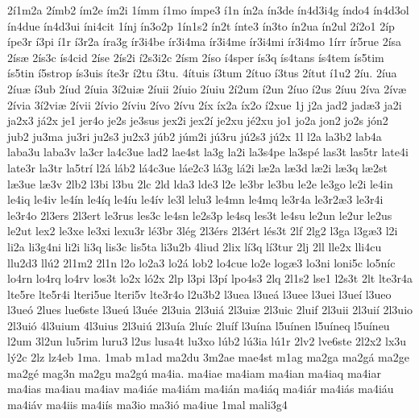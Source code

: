 {2^^ed1m2a
2^^edmb2
^^edm2e
^^edm2i
1^^edmm
^^ed1mo
^^edmpe3
^^ed1n
^^edn2a
^^edn3de
^^edn4d3i4g
^^edndo4
^^edn4d3ol
^^edn4due
^^edn4d3ui
^^edni4cit
1^^ednj
^^edn3o2p
1^^edn1s2
^^edn2t
^^ednte3
^^edn3to
^^edn2ua
^^edn2ul
2^^ed2o1
2^^edp
^^edpe3r
^^ed3pi
^^ed1r
^^ed3r2a
^^edra3g
^^edr3i4be
^^edr3i4ma
^^edr3i4me
^^edr3i4mi
^^edr3i4mo
1^^edrr
^^edr5rue
2^^edsa
2^^eds^^e6
2^^eds3c
^^eds4cid
2^^edse
2^^eds2i
^^ed2s3i2c
2^^edsm
2^^edso
^^ed4sper
^^eds3q
^^eds4tans
^^eds4tem
^^eds5tim
^^eds5tin
^^ed5strop
^^eds3uis
^^edte3r
^^ed2tu
^^ed3tu.
4^^edtuis
^^ed3tum
2^^edtuo
^^ed3tus
2^^edtut
^^ed1u2
2^^edu.
2^^edua
2^^edu^^e6
^^ed3ub
2^^edud
2^^eduia
3^^ed2ui^^e6
2^^eduii
2^^eduio
2^^eduiu
2^^ed2um
^^ed2un
2^^eduo
^^ed2us
2^^eduu
2^^edva
2^^edv^^e6
2^^edvia
3^^ed2vi^^e6
2^^edvii
2^^edvio
2^^edviu
2^^edvo
2^^edvu
2^^edx
^^edx2a
^^edx2o
^^ed2xue
1j
j2a
jad2
jad^^e63
ja2i
ja2x3
j^^e12x
je1
jer4o
je2s
je3sus
jex2i
jex2^^ed
je2xu
j^^e92xu
jo1
jo2a
jon2
jo2s
j^^f3n2
jub2
ju3ma
ju3ri
ju2s3
ju2x3
j^^fab2
j^^fam2i
j^^fa3ru
j^^fa2s3
j^^fa2x
1l
l2a
la3b2
lab4a
laba3u
laba3v
la3cr
la4c3ue
lad2
lae4st
la3g
la2i
la3s4pe
la3sp^^e9
las3t
las5tr
late4i
late3r
la3tr
la5tr^^ed
l2^^e1
l^^e1b2
l^^e14c3ue
l^^e1e2c3
l^^e13g
l^^e12i
l^^e62a
l^^e63d
l^^e62i
l^^e63q
l^^e62st
l^^e63ue
l^^e63v
2lb2
l3bi
l3bu
2lc
2ld
lda3
lde3
l2e
le3br
le3bu
le2e
le3go
le2i
le4in
le4iq
le4iv
le4^^edn
le4^^edq
le4^^edu
le4^^edv
le3l
lelu3
le4mn
le4mq
le3r4a
le3r2^^e63
le3r4i
le3r4o
2l3ers
2l3ert
le3rus
les3c
le4sn
le2s3p
le4sq
les3t
le4su
le2un
le2ur
le2us
le2ut
lex2
le3xe
le3xi
lexu3r
l^^e93br
3l^^e9g
2l3^^e9rs
2l3^^e9rt
l^^e9s3t
2lf
2lg2
l3ga
l3g^^e63
l2i
li2a
li3g4ni
li2i
li3q
lis3c
lis5ta
li3u2b
4liud
2lix
l^^ed3q
l^^ed3tur
2lj
2ll
lle2x
lli4cu
llu2d3
ll^^fa2
2l1m2
2l1n
l2o
lo2a3
lo2^^e1
lob2
lo4cue
lo2e
log^^e63
lo3ni
loni5c
lo5n^^edc
lo4rn
lo4rq
lo4rv
los3t
lo2x
l^^f32x
2lp
l3pi
l3p^^ed
lpo4s3
2lq
2l1s2
lse1
l2s3t
2lt
lte3r4a
lte5re
lte5r4i
lteri5ue
lteri5v
lte3r4o
l2u3b2
l3uea
l3ue^^e1
l3uee
l3uei
l3ue^^ed
l3ueo
l3ue^^f3
2lues
lue6ste
l3ue^^fa
l3u^^e9e
2l3uia
2l3ui^^e1
2l3ui^^e6
2l3uic
2luif
2l3uii
2l3ui^^ed
2l3uio
2l3ui^^f3
4l3uium
4l3uius
2l3ui^^fa
2l3u^^eda
2lu^^edc
2lu^^edf
l3u^^edna
l5u^^ednen
l5u^^edneq
l5u^^edneu
l2um
3l2un
lu5rim
luru3
l2us
lusa4t
lu3xo
l^^fab2
l^^fa3ia
l^^fa1r
2lv2
lve6ste
2l2x2
lx3u
l^^fd2c
2lz
lz4eb
1ma.
1mab
m1ad
ma2du
3m2ae
mae4st
m1ag
ma2ga
ma2g^^e1
ma2ge
ma2g^^e9
mag3n
ma2gu
ma2g^^fa
ma4ia.
ma4iae
ma4iam
ma4ian
ma4iaq
ma4iar
ma4ias
ma4iau
ma4iav
ma4i^^e1e
ma4i^^e1m
ma4i^^e1n
ma4i^^e1q
ma4i^^e1r
ma4i^^e1s
ma4i^^e1u
ma4i^^e1v
ma4iis
ma4i^^eds
ma3io
ma3i^^f3
ma4iue
1mal
mali3g4
}
